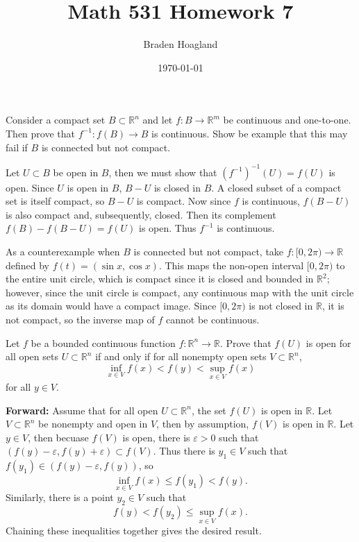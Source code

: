 \documentclass[10pt]{amsart}
\newenvironment{exercise}[1]{%
        \vspace{10mm}
        \renewcommand\themanualtheoreminner{#1}%
  \manualtheoreminner
}\hrulefill{\endmanualtheoreminner}
\begin{document}
\title{Math 531 Homework 7}
\author{Braden Hoagland}
\date{\today}
\maketitle

\begin{exercise}{7}
	Consider a compact set $B \subset \mathbb{R}^n$ and let $f:B\to\mathbb{R}^m$ be continuous and one-to-one. Then prove that $f^{-1}:f(B)\to B$ is continuous. Show be example that this may fail if $B$ is connected but not compact.
\end{exercise}

Let $U \subset B$ be open in $B$, then we must show that $(f^{-1})^{-1}(U) = f(U)$ is open. Since $U$ is open in $B$, $B-U$ is closed in $ B$. A closed subset of a compact set is itself compact, so $B-U$ is compact. Now since $f$ is continuous, $f(B-U)$ is also compact and, subsequently, closed. Then its complement $f(B) - f(B-U) = f(U)$ is open. Thus $f^{-1}$ is continuous.

As a counterexample when $B$ is connected but not compact, take $f:[0,2\pi) \to \mathbb{R}$ defined by $f(t) = (\sin x, \cos x)$. This maps the non-open interval $[0,2\pi)$ to the entire unit circle, which is compact since it is closed and bounded in $\mathbb{R}^2$; however, since the unit circle is compact, any continuous map with the unit circle as its domain would have a compact image. Since $[0,2\pi)$ is not closed in $\mathbb{R}$, it is not compact, so the inverse map of $f$ cannot be continuous.

\begin{exercise}{13}
	Let $f$ be a bounded continuous function $f:\mathbb{R}^n\to\mathbb{R}$. Prove that $f(U)$ is open for all open sets $U \subset \mathbb{R}^n$ if and only if for all nonempty open sets $V \subset \mathbb{R}^n$,
	\[
		\inf_{x\in V}f(x) < f(y) < \sup_{x\in V}f(x)
	\] for all $y \in V$.
\end{exercise}

\textbf{Forward:} Assume that for all open $U\subset \mathbb{R}^n$, the set $f(U)$ is open in $\mathbb{R}$. Let $V \subset \mathbb{R}^n$ be nonempty and open in $V$, then by assumption, $f(V)$ is open in $\mathbb{R}$. Let $y \in V$, then becuase $f(V)$ is open, there is $\varepsilon>0$ such that $(f(y)-\varepsilon, f(y)+\varepsilon)\subset f(V)$. Thus there is $y_1\in V$ such that $f(y_1)\in(f(y)-\varepsilon, f(y))$, so \[\inf_{x\in V}f(x) \leq f(y_1)<f(y).\] Similarly, there is a point $y_2\in V$ such that \[f(y) < f(y_2) \leq \sup_{x\in V}f(x).\] Chaining these inequalities together gives the desired result.
\end{document}

